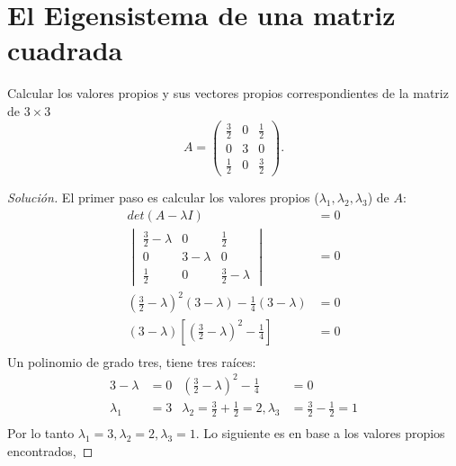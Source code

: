 \documentclass[12pt]{book}
\newenvironment{solucion}
  {\renewcommand\qedsymbol{$\square$}\begin{proof}[Solución]}
  {\end{proof}}
\begin{document}
\section{El Eigensistema de una matriz cuadrada}
\eje Calcular los valores propios y sus vectores propios correspondientes de la matriz de $3\times3$
\[ A=\begin{pmatrix}
\frac{3}{2} & 0 & \frac{1}{2}\\
0 & 3 & 0\\
\frac{1}{2} & 0 & \frac{3}{2}
\end{pmatrix}.\]
\begin{solucion}
El primer paso es calcular los valores propios ($\lambda_1,\lambda_2,\lambda_3$) de $A$:
\begin{align*}
    det(A-\lambda I)&=0\\
    \begin{vmatrix}
        \frac{3}{2}-\lambda & 0 & \frac{1}{2}\\
        0 & 3-\lambda & 0\\
        \frac{1}{2} & 0 & \frac{3}{2}-\lambda
    \end{vmatrix} &=0\\
    \left(\frac{3}{2}-\lambda\right)^2(3-\lambda)-\frac{1}{4}(3-\lambda)&=0\\
    (3-\lambda)\left[\left(\frac{3}{2}-\lambda\right)^2-\frac{1}{4}\right]&=0\\
\end{align*}
Un polinomio de grado tres, tiene tres raíces:
\begin{align*}
    3-\lambda&=0 & \left(\frac{3}{2}-\lambda\right)^2-\frac{1}{4}&=0\\
    \lambda_1&=3 & \lambda_2=\frac{3}{2}+\frac{1}{2}=2, \lambda_3&=\frac{3}{2}-\frac{1}{2}=1\\
\end{align*}
Por lo tanto $\lambda_1 =3, \lambda_2=2,\lambda_3=1$. Lo siguiente es en base a los valores propios encontrados, 
\end{solucion}
\end{document}
